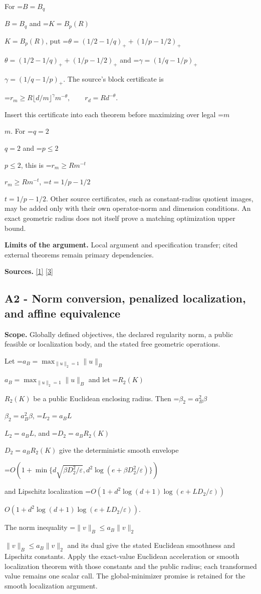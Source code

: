 \documentclass[10pt,a4paper]{article}
\newcommand{\AtlasMath}[1]{\par\begingroup\centering\setbox0=\hbox{$\displaystyle #1$}\ifdim\wd0>1.4\linewidth\typeout{ATLAS WIDE FORMULA: \the\wd0}\fi\ifdim\wd0>\linewidth\resizebox{\linewidth}{!}{\box0}\else\box0\fi\par\endgroup}
\newcommand{\AtlasInlineMath}[1]{\begingroup\setbox0=\hbox{$#1$}\ifdim\wd0>.4\linewidth\endgroup\AtlasMath{#1}\else\endgroup$#1$\fi}
\begin{document}
For \AtlasInlineMath{B=B_q} and \AtlasInlineMath{K=B_p(R)}, put \AtlasInlineMath{\theta=(1/2-1/q)_++(1/p-1/2)_+} and \AtlasInlineMath{\gamma=(1/q-1/p)_+}. The source's block certificate is

\AtlasMath{r_m\ge R\lfloor d/m\rfloor^\gamma m^{-\theta},\qquad r_d=Rd^{-\theta}.}

Insert this certificate into each theorem before maximizing over legal \AtlasInlineMath{m}. For \AtlasInlineMath{q=2} and \AtlasInlineMath{p\le2}, this is \AtlasInlineMath{r_m\ge Rm^{-t}}, \AtlasInlineMath{t=1/p-1/2}. Other source certificates, such as constant-radius quotient images, may be added only with their own operator-norm and dimension conditions. An exact geometric radius does not itself prove a matching optimization upper bound.

\textbf{Limits of the argument.} Local argument and specification transfer; cited external theorems remain primary dependencies.

\textbf{Sources.} \href{https://arxiv.org/html/2610.00345v1}{[1]} \href{https://arxiv.org/html/2607.16558v2}{[3]}

\subsection{A2 - Norm conversion, penalized localization, and affine equivalence}
\textbf{Scope.} Globally defined objectives, the declared regularity norm, a public feasible or localization body, and the stated free geometric operations.

Let \AtlasInlineMath{a_B=\max_{\|u\|_2=1}\|u\|_B} and let \AtlasInlineMath{R_2(K)} be a public Euclidean enclosing radius. Then \AtlasInlineMath{\beta_2=a_B^2\beta}, \AtlasInlineMath{L_2=a_BL}, and \AtlasInlineMath{D_2=a_BR_2(K)} give the deterministic smooth envelope

\AtlasMath{O\!\left(1+\min\{d\sqrt{\beta D_2^2/\varepsilon},d^2\log(e+\beta D_2^2/\varepsilon)\}\right)}

and Lipschitz localization \AtlasInlineMath{O(1+d^2\log(d+1)\log(e+LD_2/\varepsilon))}.

The norm inequality \AtlasInlineMath{\|v\|_B\le a_B\|v\|_2} and its dual give the stated Euclidean smoothness and Lipschitz constants. Apply the exact-value Euclidean acceleration or smooth localization theorem with those constants and the public radius; each transformed value remains one scalar call. The global-minimizer promise is retained for the smooth localization argument.
\end{document}
